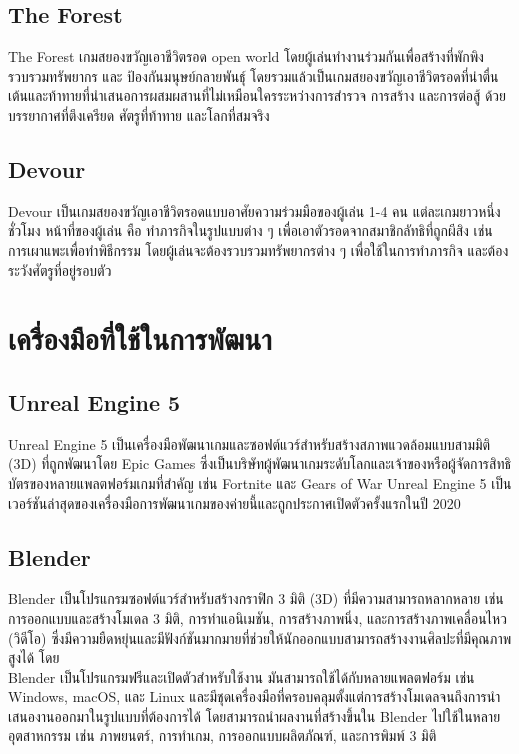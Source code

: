 \subsection{The Forest}

The Forest เกมสยองขวัญเอาชีวิตรอด open world โดยผู้เล่นทำงานร่วมกันเพื่อสร้างที่พักพิง รวบรวมทรัพยากร และ ป้องกันมนุษย์กลายพันธุ์ โดยรวมแล้วเป็นเกมสยองขวัญเอาชีวิตรอดที่น่าตื่นเต้นและท้าทายที่นำเสนอการผสมผสานที่ไม่เหมือนใครระหว่างการสำรวจ การสร้าง และการต่อสู้ ด้วยบรรยากาศที่ตึงเครียด ศัตรูที่ท้าทาย และโลกที่สมจริง \cite{TheForest}



\subsection{Devour}

Devour เป็นเกมสยองขวัญเอาชีวิตรอดแบบอาศัยความร่วมมือของผู้เล่น 1-4 คน แต่ละเกมยาวหนึ่งชั่วโมง หน้าที่ของผู้เล่น คือ ทำภารกิจในรูปแบบต่าง ๆ เพื่อเอาตัวรอดจากสมาชิกลัทธิที่ถูกผีสิง เช่น การเผาแพะเพื่อทำพิธีกรรม โดยผู้เล่นจะต้องรวบรวมทรัพยากรต่าง ๆ เพื่อใช้ในการทำภารกิจ และต้องระวังศัตรูที่อยู่รอบตัว \cite{Devour}

\section{เครื่องมือที่ใช้ในการพัฒนา}
\subsection{Unreal Engine 5}
Unreal Engine 5 เป็นเครื่องมือพัฒนาเกมและซอฟต์แวร์สำหรับสร้างสภาพแวดล้อมแบบสามมิติ (3D) ที่ถูกพัฒนาโดย Epic Games ซึ่งเป็นบริษัทผู้พัฒนาเกมระดับโลกและเจ้าของหรือผู้จัดการสิทธิบัตรของหลายแพลตฟอร์มเกมที่สำคัญ เช่น Fortnite และ Gears of War Unreal Engine 5 เป็นเวอร์ชันล่าสุดของเครื่องมือการพัฒนาเกมของค่ายนี้และถูกประกาศเปิดตัวครั้งแรกในปี 2020

\subsection{Blender}
Blender เป็นโปรแกรมซอฟต์แวร์สำหรับสร้างกราฟิก 3 มิติ (3D) ที่มีความสามารถหลากหลาย เช่น การออกแบบและสร้างโมเดล 3 มิติ, การทำแอนิเมชัน, การสร้างภาพนิ่ง, และการสร้างภาพเคลื่อนไหว (วิดีโอ) ซึ่งมีความยืดหยุ่นและมีฟังก์ชันมากมายที่ช่วยให้นักออกแบบสามารถสร้างงานศิลปะที่มีคุณภาพสูงได้ โดย \\Blender เป็นโปรแกรมฟรีและเปิดตัวสำหรับใช้งาน มันสามารถใช้ได้กับหลายแพลตฟอร์ม เช่น Windows, macOS, และ Linux และมีชุดเครื่องมือที่ครอบคลุมตั้งแต่การสร้างโมเดลจนถึงการนำเสนองานออกมาในรูปแบบที่ต้องการได้ โดยสามารถนำผลงานที่สร้างขึ้นใน Blender ไปใช้ในหลายอุตสาหกรรม เช่น ภาพยนตร์, การทำเกม, การออกแบบผลิตภัณฑ์, และการพิมพ์ 3 มิติ

